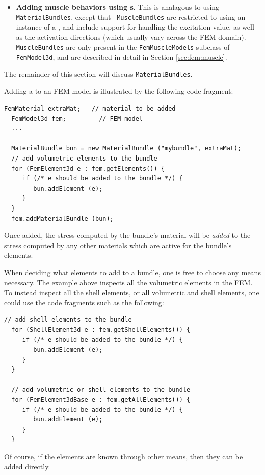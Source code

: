 \begin{itemize}
\item {\bf Adding muscle behaviors using 
s}. This
is analagous to using {\tt MaterialBundles}, except that {\tt
MuscleBundles} are restricted to using an instance of
a , and include
support for handling the excitation value, as well as the activation
directions (which usually vary across the FEM domain). {\tt
MuscleBundles} are only present in the {\tt FemMuscleModels} subclass
of {\tt FemModel3d}, and are described in detail in
Section \ref{sec:fem:muscle}.

\end{itemize}

The remainder of this section will discuss {\tt MaterialBundles}.

Adding a  to
an FEM model is illustrated by the following code fragment:
%
\begin{lstlisting}[]
  FemMaterial extraMat;   // material to be added
  FemModel3d fem;         // FEM model
  ...
  
  MaterialBundle bun = new MaterialBundle ("mybundle", extraMat);
  // add volumetric elements to the bundle
  for (FemElement3d e : fem.getElements()) {
     if (/* e should be added to the bundle */) {
        bun.addElement (e);
     }
  }
  fem.addMaterialBundle (bun);  
\end{lstlisting}
%
Once added, the stress computed by the bundle's material will be {\it
added} to the stress computed by any other materials which are active
for the bundle's elements.

When deciding what elements to add to a bundle, one is free to choose
any means necessary. The example above inspects all the volumetric
elements in the FEM. To instead inspect all the shell elements, or all
volumetric and shell elements, one could use the code
fragments such as the following:
%
\begin{lstlisting}[]
  // add shell elements to the bundle
  for (ShellElement3d e : fem.getShellElements()) {
     if (/* e should be added to the bundle */) {
        bun.addElement (e);
     }
  }

  // add volumetric or shell elements to the bundle
  for (FemElement3dBase e : fem.getAllElements()) {
     if (/* e should be added to the bundle */) {
        bun.addElement (e);
     }
  }
\end{lstlisting}
%
Of course, if the elements are known through other means, then they
can be added directly.

